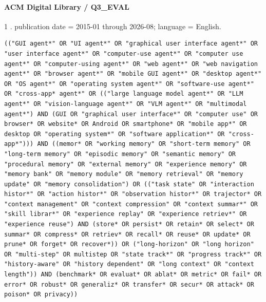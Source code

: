 \noindent\begin{minipage}{\linewidth}
\paragraph{ACM Digital Library / Q3\_EVAL}
1 .
publication date = 2015-01 through 2026-08; language = English.
\begin{lstlisting}
(("GUI agent*" OR "UI agent*" OR "graphical user interface agent*" OR "user interface agent*" OR "computer-use agent*" OR "computer use agent*" OR "computer-using agent*" OR "web agent*" OR "web navigation agent*" OR "browser agent*" OR "mobile GUI agent*" OR "desktop agent*" OR "OS agent*" OR "operating system agent*" OR "software-use agent*" OR "cross-app* agent*" OR (("large language model agent*" OR "LLM agent*" OR "vision-language agent*" OR "VLM agent*" OR "multimodal agent*") AND (GUI OR "graphical user interface*" OR "computer use" OR browser* OR website* OR Android OR smartphone* OR "mobile app*" OR desktop OR "operating system*" OR "software application*" OR "cross-app*"))) AND ((memor* OR "working memory" OR "short-term memory" OR "long-term memory" OR "episodic memory" OR "semantic memory" OR "procedural memory" OR "external memory" OR "experience memory" OR "memory bank" OR "memory module" OR "memory retrieval" OR "memory update" OR "memory consolidation") OR (("task state" OR "interaction histor*" OR "action histor*" OR "observation histor*" OR trajector* OR "context management" OR "context compression" OR "context summar*" OR "skill librar*" OR "experience replay" OR "experience retriev*" OR "experience reuse") AND (store* OR persist* OR retain* OR select* OR summar* OR compress* OR retriev* OR recall* OR reuse* OR update* OR prune* OR forget* OR recover*)) OR ("long-horizon" OR "long horizon" OR "multi-step" OR multistep OR "state track*" OR "progress track*" OR "history-aware" OR "history dependent" OR "long context" OR "context length")) AND (benchmark* OR evaluat* OR ablat* OR metric* OR fail* OR error* OR robust* OR generaliz* OR transfer* OR secur* OR attack* OR poison* OR privacy))
\end{lstlisting}
\end{minipage}\par\medskip
